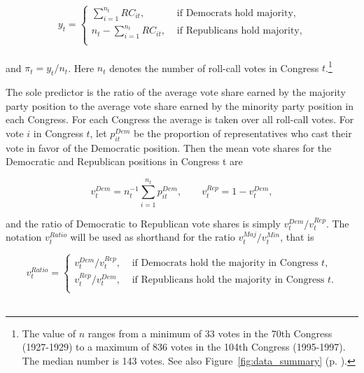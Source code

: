 \begin{equation*}
y_t =
\begin{cases} \sum_{i=1}^{n_t} RC_{it}, & \text{ if Democrats hold majority}, \\[10pt]
n_t - \sum_{i=1}^{n_t} RC_{it}, & \text{ if Republicans hold majority,} \\
\end{cases}
\end{equation*}
~\\[-12pt]
 
\noindent and $\pi_t = y_t / n_t$. Here $n_t$ denotes the number of roll-call votes in 
Congress $t$.\footnote{The value of $n$ ranges from a minimum of 33 votes in the 
70th Congress (1927-1929) to a maximum of 836 votes in the 104th Congress (1995-1997). 
The median number is 143 votes. See also Figure~\ref{fig:data_summary} 
(p. \pageref{fig:data_summary}).} 


The sole predictor is the ratio of the average vote share earned by the majority party position 
to the average vote share earned by the minority party position in each Congress. For each 
Congress the average is taken over all roll-call votes. For vote $i$ in Congress $t$, let 
$p_{it}^{Dem}$ be the proportion of representatives who cast their vote in favor of the Democratic 
position.  Then the mean vote shares for the Democratic and Republican positions in Congress t are

\begin{equation*}
v_t^{Dem} = n_t^{-1} \sum_{i=1}^{n_t} p_{it}^{Dem}, \qquad v_t^{Rep} = 1 - v_t^{Dem},
\end{equation*}

\noindent and the ratio of Democratic to Republican vote shares is simply $v_t^{Dem} / v_t^{Rep}$. The notation $v_t^{Ratio}$ will be used as shorthand for the ratio $v_t^{Maj} / v_t^{Min}$, that is 

\begin{equation*}
v_t^{Ratio} = 
\begin{cases} 
v_t^{Dem} / v_t^{Rep}, & \text{ if Democrats hold the majority in Congress $t$,} \\[10pt]
v_t^{Rep} / v_t^{Dem}, & \text{ if Republicans hold the majority in Congress $t$.} \\
\end{cases}
\end{equation*}
~\\[-12pt]


